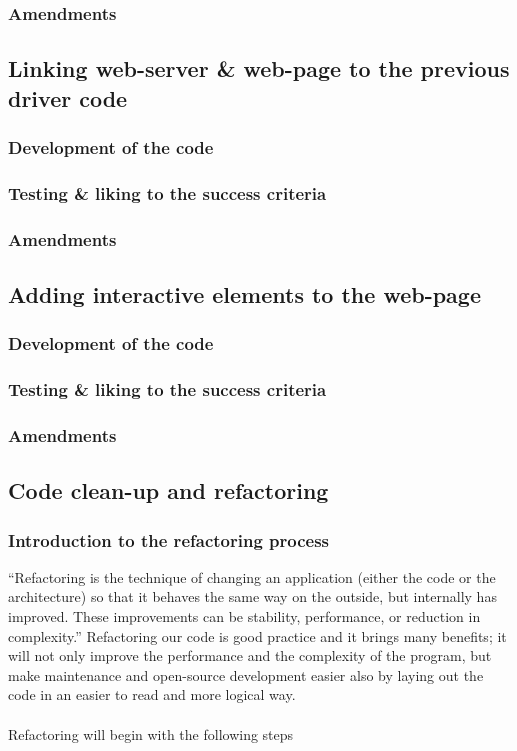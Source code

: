 \documentclass[9pt]{article}
\begin{document}
\subsubsection{Amendments}


\subsection{Linking web-server \& web-page to the previous driver code}
\subsubsection{Development of the code}
\subsubsection{Testing \& liking to the success criteria}
\subsubsection{Amendments}


\subsection{Adding interactive elements to the web-page}
\subsubsection{Development of the code}
\subsubsection{Testing \& liking to the success criteria}
\subsubsection{Amendments}

\newpage
\subsection{Code clean-up and refactoring}
\subsubsection{Introduction to the refactoring process}
``Refactoring is the technique of changing an application (either the code or the architecture) so that it behaves the same way on the outside, but internally has improved. These improvements can be stability, performance, or reduction in complexity.\cite{codeRefactoring}'' Refactoring our code is good practice and it brings many benefits; it will not only improve the performance and the complexity of the program, but make maintenance and open-source development easier also by laying out the code in an easier to read and more logical way.\\\\
Refactoring will begin with the following steps
\end{document}
